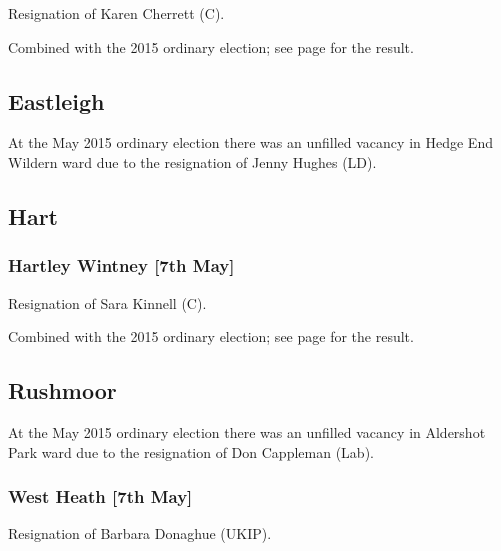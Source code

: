 \documentclass[a4paper,openany]{book}
\begin{document}
\begin{resultsiii}

Resignation of Karen Cherrett (C).

Combined with the 2015 ordinary election; see page \pageref{RooksdownBasingstokeDeane} for the result.

\subsection*{Eastleigh}

At the May 2015 ordinary election there was an unfilled vacancy in Hedge End Wildern ward due to the resignation of Jenny Hughes (LD).

\subsection*{Hart}

\subsubsection*{Hartley Wintney \hspace*{\fill}\nolinebreak[1]%
\enspace\hspace*{\fill}
[7th May]}


Resignation of Sara Kinnell (C).

Combined with the 2015 ordinary election; see page \pageref{HartleyWintneyHart} for the result.

\subsection*{Rushmoor}

At the May 2015 ordinary election there was an unfilled vacancy in Aldershot Park ward due to the resignation of Don Cappleman (Lab).

\subsubsection*{West Heath \hspace*{\fill}\nolinebreak[1]%
\enspace\hspace*{\fill}
[7th May]}


Resignation of Barbara Donaghue (UKIP).


\end{resultsiii}
\end{document}
